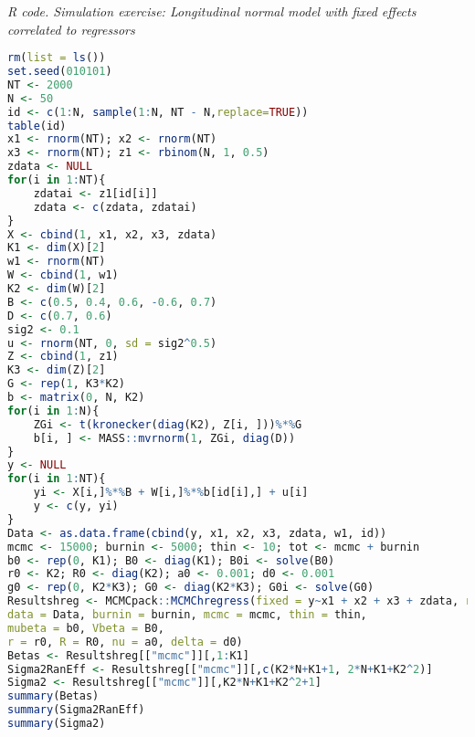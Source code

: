 \begin{enumerate}[leftmargin=*]
\begin{tcolorbox}[enhanced,width=4.67in,center upper,
	fontupper=\large\bfseries,drop shadow southwest,sharp corners]
	\textit{R code. Simulation exercise: Longitudinal normal model with fixed effects correlated to regressors}
	\begin{VF}
		\begin{lstlisting}[language=R]
rm(list = ls())
set.seed(010101)
NT <- 2000
N <- 50
id <- c(1:N, sample(1:N, NT - N,replace=TRUE))
table(id)
x1 <- rnorm(NT); x2 <- rnorm(NT)
x3 <- rnorm(NT); z1 <- rbinom(N, 1, 0.5)
zdata <- NULL
for(i in 1:NT){
	zdatai <- z1[id[i]]
	zdata <- c(zdata, zdatai)
}
X <- cbind(1, x1, x2, x3, zdata)
K1 <- dim(X)[2]
w1 <- rnorm(NT) 
W <- cbind(1, w1)
K2 <- dim(W)[2]
B <- c(0.5, 0.4, 0.6, -0.6, 0.7)
D <- c(0.7, 0.6)
sig2 <- 0.1
u <- rnorm(NT, 0, sd = sig2^0.5)
Z <- cbind(1, z1)
K3 <- dim(Z)[2]
G <- rep(1, K3*K2)
b <- matrix(0, N, K2)
for(i in 1:N){
	ZGi <- t(kronecker(diag(K2), Z[i, ]))%*%G
	b[i, ] <- MASS::mvrnorm(1, ZGi, diag(D))
}
y <- NULL
for(i in 1:NT){
	yi <- X[i,]%*%B + W[i,]%*%b[id[i],] + u[i] 
	y <- c(y, yi)
}
Data <- as.data.frame(cbind(y, x1, x2, x3, zdata, w1, id))
mcmc <- 15000; burnin <- 5000; thin <- 10; tot <- mcmc + burnin
b0 <- rep(0, K1); B0 <- diag(K1); B0i <- solve(B0) 
r0 <- K2; R0 <- diag(K2); a0 <- 0.001; d0 <- 0.001
g0 <- rep(0, K2*K3); G0 <- diag(K2*K3); G0i <- solve(G0)
Resultshreg <- MCMCpack::MCMChregress(fixed = y~x1 + x2 + x3 + zdata, random = ~w1, group="id",
data = Data, burnin = burnin, mcmc = mcmc, thin = thin, 
mubeta = b0, Vbeta = B0,
r = r0, R = R0, nu = a0, delta = d0)
Betas <- Resultshreg[["mcmc"]][,1:K1]
Sigma2RanEff <- Resultshreg[["mcmc"]][,c(K2*N+K1+1, 2*N+K1+K2^2)]
Sigma2 <- Resultshreg[["mcmc"]][,K2*N+K1+K2^2+1]
summary(Betas)
summary(Sigma2RanEff)
summary(Sigma2)
\end{lstlisting}
	\end{VF}
\end{tcolorbox}



\end{enumerate}
